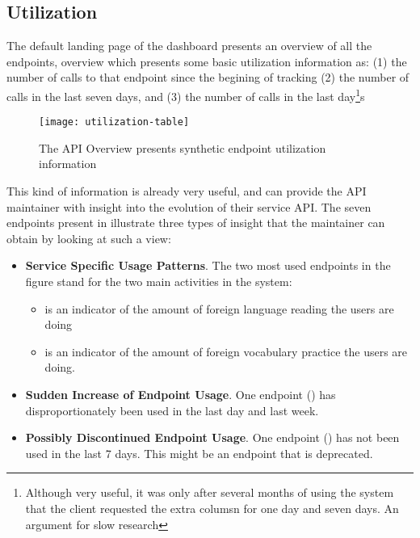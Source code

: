 


\subsection{Utilization}
\label{sec:util}
 
  The default landing page of the dashboard presents an overview of all the endpoints, 
  overview which presents some basic utilization information as:
  (1) the number of calls to that endpoint since the begining of tracking
  (2) the number of calls in the last seven days, and
  (3) the number of calls in the last day\footnote{Although very useful, it was only after several months of using the system that the client requested the extra columsn for one day and seven days. An argument for slow research}s 

    \begin{figure}[h!]
      \centering
      \texttt{[image: utilization-table]}
      \caption{The API Overview presents synthetic endpoint utilization information}
      \label{fig:basicest}
    \end{figure}

  This kind of information is already very useful, and can provide the API maintainer with insight into the evolution of their service API. The seven endpoints present in  illustrate three types of insight that the maintainer can obtain by looking at such a view: 

  \begin{itemize}

    \item {\bf Service Specific Usage Patterns}. The two most used endpoints in the figure stand for the two main activities in the system: 

      \begin{itemize}

        \item \epTranslationsColor is an indicator of the amount of foreign language reading the users are doing 

        \item \epOutcomeColor is an indicator of the amount of foreign vocabulary practice the users are doing.

      \end{itemize}

    \item {\bf Sudden Increase of Endpoint Usage}. One endpoint (\epUserActivityColor) has disproportionately been used in the last day and last week. 

    \item {\bf Possibly Discontinued Endpoint Usage}. One endpoint (\epFeedItemsColor) has not been used in the last 7 days. This might be an endpoint that is deprecated.

  \end{itemize}



